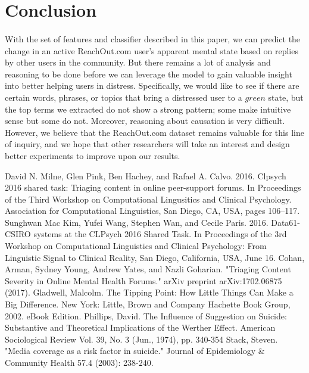\documentclass{article}
\begin{document}
\section{Conclusion}

\paragraph{}With the set of features and classifier described in this paper, we can predict the change in an active ReachOut.com user's apparent mental state based on replies by other users in the community. But there remains a lot of analysis and reasoning to be done before we can leverage the model to gain valuable insight into better helping users in distress. Specifically, we would like to see if there are certain words, phrases, or topics that bring a distressed user to a $green$ state, but the top terms we extracted do not show a strong pattern; some make intuitive sense but some do not. Moreover, reasoning about causation is very difficult. However, we believe that the ReachOut.com dataset remains valuable for this line of inquiry, and we hope that other researchers will take an interest and design better experiments to improve upon our results.

\begin{thebibliography}{9}

	David N. Milne, Glen Pink, Ben Hachey, and Rafael A. Calvo. 2016. Clpsych 2016 shared task: Triaging content in online peer-support forums. In Proceedings of the Third Workshop on Computational Lingusitics and Clinical Psychology. Association for Computational Linguistics, San Diego, CA, USA, pages 106–117.
	Sunghwan Mac Kim, Yufei Wang, Stephen Wan, and Cecile Paris. 2016. Data61-CSIRO systems at the CLPsych 2016 Shared Task. In Proceedings of the 3rd Workshop on Computational Linguistics and Clinical Psychology: From Linguistic Signal to Clinical Reality, San Diego, California, USA, June 16.
        Cohan, Arman, Sydney Young, Andrew Yates, and Nazli Goharian. "Triaging Content Severity in Online Mental Health Forums." arXiv preprint arXiv:1702.06875 (2017).
        Gladwell, Malcolm. The Tipping Point: How Little Things Can Make a Big Difference. New York: Little, Brown and Company Hachette Book Group, 2002. eBook Edition.
        Phillips, David. The Influence of Suggestion on Suicide: Substantive and Theoretical Implications of the Werther Effect. American Sociological Review Vol. 39, No. 3 (Jun., 1974), pp. 340-354
        Stack, Steven. "Media coverage as a risk factor in suicide." Journal of Epidemiology \& Community Health 57.4 (2003): 238-240.

\end{thebibliography}
\end{document}
